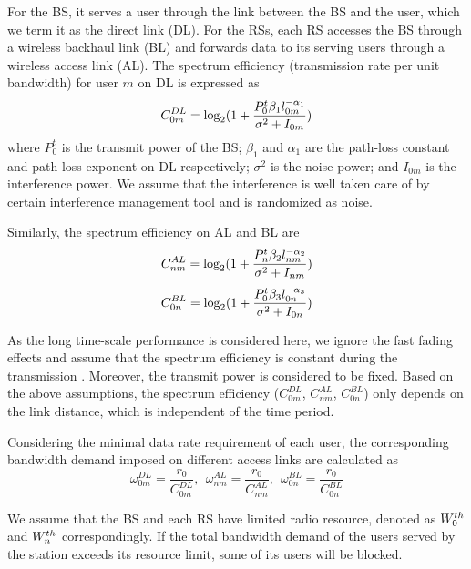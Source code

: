 \documentclass[conference]{IEEEtran}
\begin{document}
 For the BS, it serves a user through the link between the BS and the user, which we term it as the direct link (DL). For the RSs, each RS accesses the BS through a wireless backhaul link (BL) and forwards data to its serving users through a wireless access link (AL). The spectrum efficiency (transmission rate per unit bandwidth) for user $m$ on DL is expressed as
 \begin{equation}\label{equ:spectrum efficiency on DL}
  \small{C_{0m}^{DL} = \log_2(1+\frac{P^t_0\beta_1l_{0m}^{-\alpha_1}}{\sigma^2+I_{0m}})}
 \end{equation}
 where $P^t_0$ is the transmit power of the BS; $\beta_1$ and $\alpha_1$ are the path-loss constant and path-loss exponent on DL respectively; $\sigma^2$ is the noise power; and $I_{0m}$ is the interference power. We assume that the interference is well taken care of by certain interference management tool and is randomized as noise.

 Similarly, the spectrum efficiency on AL and BL are
 \begin{equation}\label{equ:spectrum efficiency on AL}
  \small{C_{nm}^{AL} = \log_2(1+\frac{P^t_n\beta_2l_{nm}^{-\alpha_2}}{\sigma^2+I_{nm}})}
 \end{equation}
 \begin{equation}\label{equ:spectrum efficiency on BL}
  \small{C_{0n}^{BL} = \log_2(1+\frac{P^t_0\beta_3l_{0n}^{-\alpha_3}}{\sigma^2+I_{0n}})}
 \end{equation}

 As the long time-scale performance is considered here, we ignore the fast fading effects and assume that the spectrum efficiency is constant during the transmission \cite{Jie2012Adynamic}. Moreover, the transmit power is considered to be fixed. Based on the above assumptions, the spectrum efficiency ($C_{0m}^{DL}$, $C_{nm}^{AL}$, $C_{0n}^{BL}$) only depends on the link distance, which is independent of the time period.

 Considering the minimal data rate requirement of each user, the corresponding bandwidth demand imposed on different access links are calculated as
 \begin{equation}\label{equ:bandwidth demand}
  \omega_{0m}^{DL} = \frac{r_0}{C_{0m}^{DL}},~~
  \omega_{nm}^{AL} = \frac{r_0}{C_{nm}^{AL}},~~
  \omega_{0n}^{BL} = \frac{r_0}{C_{0n}^{BL}}
 \end{equation}

 We assume that the BS and each RS have limited radio resource, denoted as $\small{W^{th}_0}$ and $\small{W^{th}_n}$ correspondingly. If the total bandwidth demand of the users served by the station exceeds its resource limit, some of its users will be blocked.
\end{document}
